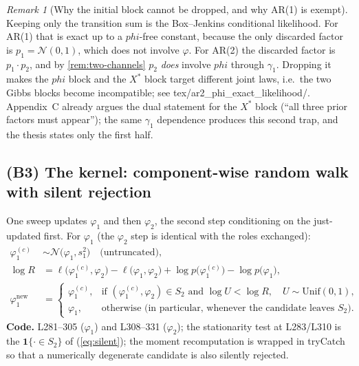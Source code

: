 \documentclass[11pt]{article}
\newcommand{\bphi}{\boldsymbol{\varphi}}
\newcommand{\ind}{\mathbf{1}}
\newcommand{\Norm}{\mathcal{N}}
\newcommand{\Unif}{\mathrm{Unif}}
\DeclareRobustCommand{\code}[1]{\texttt{#1}}
\newcommand{\eref}[1]{(\ref{#1})}
\def\bphi{phi}%
\def\boldsymbol#1{#1}%
\def\code#1{#1}%
\theoremstyle{plain}
\theoremstyle{definition}
\theoremstyle{remark}
\newtheorem{remark}[proposition]{Remark}
\begin{document}
\begin{remark}[Why the initial block cannot be dropped, and why AR(1) is exempt]
\label{rem:exact}
Keeping only the transition sum is the Box--Jenkins conditional likelihood.
For AR(1) that is exact up to a $\bphi$-free constant, because the only
discarded factor is $p_1 = \Norm(0,1)$, which does not involve $\varphi$. For
AR(2) the discarded factor is $p_1 \cdot p_2$, and by
\cref{rem:two-channels} $p_2$ \emph{does} involve $\bphi$ through $\gamma_1$.
Dropping it makes the $\bphi$ block and the $X^{*}$ block target different
joint laws, i.e.\ the two Gibbs blocks become incompatible; see
\code{tex/ar2\_phi\_exact\_likelihood/}. Appendix~C already argues the dual
statement for the $X^{*}$ block (``all three prior factors must appear''); the
same $\gamma_1$ dependence produces this second trap, and the thesis states
only the first half.
\end{remark}

\subsection{(B3) The kernel: component-wise random walk with silent rejection}

One sweep updates $\varphi_1$ and then $\varphi_2$, the second step
conditioning on the just-updated first. For $\varphi_1$ (the $\varphi_2$ step
is identical with the roles exchanged):
\begin{align}
  \varphi_1^{(c)} &\sim \Norm\bigl(\varphi_1, s_1^2\bigr) \quad\text{(untruncated)}, \label{eq:phi-prop}\\[2pt]
  \log R &= \ell\bigl(\varphi_1^{(c)}, \varphi_2\bigr) - \ell\bigl(\varphi_1, \varphi_2\bigr)
            + \log p\bigl(\varphi_1^{(c)}\bigr) - \log p\bigl(\varphi_1\bigr),
            \label{eq:phi-ratio}\\[2pt]
  \varphi_1^{\text{new}} &=
  \begin{cases}
    \varphi_1^{(c)}, & \text{if } (\varphi_1^{(c)}, \varphi_2) \in S_2 \text{ and } \log U < \log R, \quad U \sim \Unif(0,1),\\[2pt]
    \varphi_1,       & \text{otherwise (in particular, whenever the candidate leaves } S_2).
  \end{cases}
  \label{eq:silent}
\end{align}
\textbf{Code.} L281--305 ($\varphi_1$) and L308--331 ($\varphi_2$); the
stationarity test at L283/L310 is the $\ind\{\cdot \in S_2\}$ of
\eref{eq:silent}; the moment recomputation is wrapped in \code{tryCatch} so
that a numerically degenerate candidate is also silently rejected.
\end{document}
